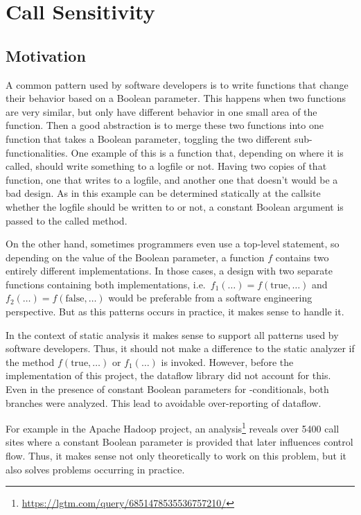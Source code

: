 \section{Call Sensitivity}
\label{sec:call-sens}
\subsection{Motivation}
A common pattern used by software developers is to 
write functions that change their behavior based on 
a Boolean parameter.
This happens when two functions are very similar, but only have different behavior
in one small area of the function.
Then a good abstraction is to merge these two functions into one function that takes 
a Boolean parameter, toggling the two different sub-functionalities.
One example of this is a function that, depending on where it is called,
should write something to a logfile or not.
Having two copies of that function, one that writes to a logfile, and another one 
that doesn't would be a bad design.
As in this example can be determined statically at the callsite whether the logfile
should be written to or not, a constant Boolean argument is passed to the called method.

On the other hand, sometimes programmers even use a top-level
 statement, so depending on the
value of the Boolean parameter, a function $f$ contains two entirely different implementations.
In those cases, a design with two separate functions containing both implementations,
i.e.\ $f_1(\ldots) = f(\text{true}, \ldots)$ and $f_2(\ldots) = f(\text{false}, \ldots)$
would be preferable from a software engineering perspective. But as this patterns
occurs in practice, it makes sense to handle it.

In the context of static analysis it makes sense to support all patterns
used by software developers.
Thus, it should not make a difference to the static analyzer
if the method $f(\text{true}, \ldots)$ or $f_1(\ldots)$ is invoked.
However, before the implementation of this project, the dataflow library did not 
account for this.
Even in the presence of constant Boolean parameters for -conditionals,
both branches were analyzed.
This lead to avoidable over-reporting of dataflow.

For example in the Apache Hadoop project, an analysis\footnote{\url{https://lgtm.com/query/6851478535536757210/}}
reveals over 5400 call sites 
where a constant Boolean parameter is provided that later influences control flow.
Thus, it makes sense not only theoretically to work on this problem, but it also 
solves problems occurring in practice.

